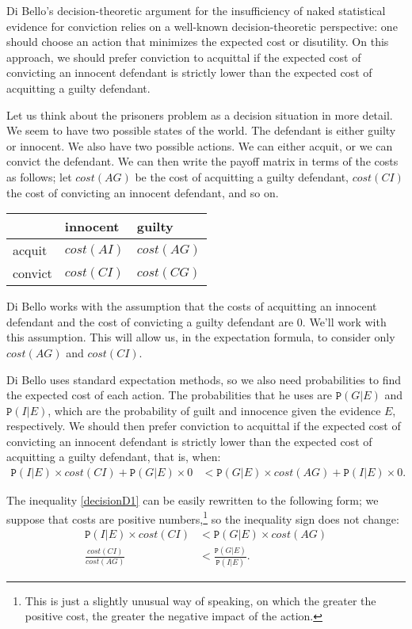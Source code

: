 \documentclass{article}
\newcommand{\pr}[1]{\mbox{$\mathtt{P}(#1)$}}
\begin{document}
	Di Bello's  decision-theoretic argument for the insufficiency of naked statistical evidence for conviction relies on a well-known decision-theoretic perspective: one should choose an action that minimizes the expected cost or disutility. On this approach, we should prefer conviction to acquittal if the expected cost of convicting an innocent defendant is strictly lower than the expected cost of acquitting a guilty defendant.
	
	Let us think about the prisoners problem as a decision situation in more  detail. We seem to have two possible states of the world. The defendant is either guilty or innocent. We also have two possible actions. We can either acquit, or we can convict the defendant. We can then write the payoff matrix in terms of the costs as follows; let $cost(AG)$ be the cost of acquitting a guilty defendant, $cost(CI)$ the cost of convicting an innocent defendant, and so on.
	

\begin{center}
\begin{tabular}{@{}lll@{}}
\toprule
& innocent & guilty \\ \midrule
acquit & $cost(AI)$ & $cost(AG)$ \\
convict & $cost(CI)$ & $cost(CG)$ \\
\end{tabular}
\end{center}

	
\noindent Di Bello works with the assumption that  the costs of acquitting an innocent defendant and the cost of convicting a guilty defendant are $0$. We'll work with this assumption. This will allow us, in the expectation formula, to consider only $cost(AG)$ and $cost(CI)$.

Di Bello uses standard expectation methods, so we also need probabilities to find the expected cost of each action.  The probabilities that he uses are $\pr{G\vert E}$ and $\pr{I\vert E}$, which are the probability of guilt and innocence given the evidence $E$, respectively. We should then prefer conviction to acquittal if the expected cost of convicting an innocent defendant is strictly lower than the expected cost of acquitting a guilty defendant, that is, when:
	\begin{align}\label{decisionD1}
	\pr{I\vert E} \times cost(CI)+\pr{G\vert E}\times 0 & <\pr{G\vert E}\times cost(AG)+\pr{I\vert E}\times 0.
	\end{align}    
	
\noindent The inequality \eqref{decisionD1} can be easily rewritten to the following form; we suppose that costs are positive numbers,\footnote{This is just a slightly unusual way of speaking, on which the greater the positive cost, the greater the negative impact of the action.} so the inequality sign does not change:
	\begin{align}\label{decisionD2}
	\pr{I\vert E} \times cost(CI) &<\pr{G\vert E}\times cost(AG) \nonumber \\
 	\frac{cost(CI)}{cost(AG)}&<\frac{\pr{G\vert E}}{\pr{I\vert E}}               .
\end{align}    
\end{document}
